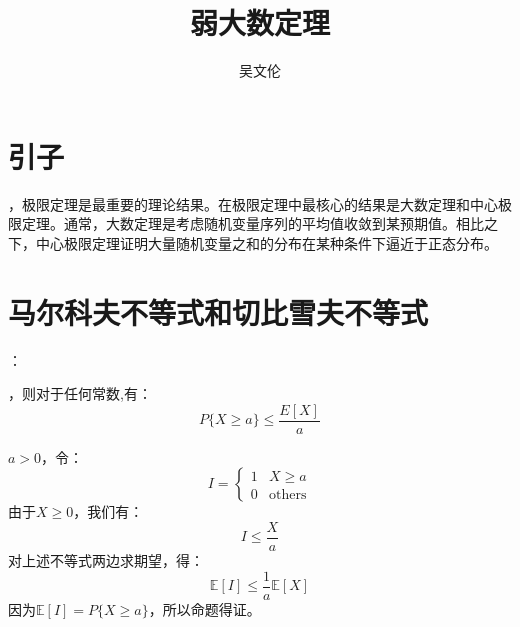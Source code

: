 \documentclass[UTF8]{article}
\title{弱大数定理}
\author{吴文伦}
\begin{document}
\maketitle

\begin{abstract}

\end{abstract}

\section{引子}
，极限定理是最重要的理论结果。在极限定理中最核心的结果是大数定理和中心极限定理。通常，大数定理是考虑随机变量序列的平均值收敛到某预期值。相比之下，中心极限定理证明大量随机变量之和的分布在某种条件下逼近于正态分布。

\section{马尔科夫不等式和切比雪夫不等式}
：
\begin{shaded}  
，则对于任何常数,有：
\begin{equation}
\label{eq:1}
P\{ X \geq a \} \leq \frac{E[X]}{a}
\end{equation}  
\end{shaded}
\begin{shaded}  
	\(a > 0\)，令：
	\begin{equation}
	\label{eq:2}
	I =
	\begin{cases}
	1 & X \geq a\\
	0 & \mathrm{others}
	\end{cases}
	\end{equation}
	由于\(X\geq 0\)，我们有：
	\begin{equation}
	\label{eq:3}
	I \leq \frac{X}{a}
	\end{equation}
	对上述不等式两边求期望，得：
	\begin{equation}
	\label{eq:4}
	\mathbb{E}[I] \leq \frac{1}{a}\mathbb{E}[X]
	\end{equation}
	因为\(\mathbb{E}[I] = P\{X\geq a\}\)，所以命题得证。
\end{shaded}
\end{document}
